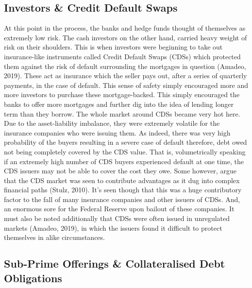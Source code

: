 \documentclass[11pt, english]{article}
\begin{document}
	\subsection{Investors \& Credit Default Swaps}

	At this point in the process, the banks and hedge funds thought of themselves as extremely low risk. The cash investors on the other hand, carried heavy weight of risk on their shoulders. This is when investors were beginning to take out insurance-like instruments called Credit Default Swaps (CDSs) which protected them against the risk of default surrounding the mortgages in question (Amadeo, 2019). These act as insurance which the seller pays out, after a series of quarterly payments, in the case of default. This sense of safety simply encouraged more and more investors to purchase these mortgage-backed. This simply encouraged the banks to offer more mortgages and further dig into the idea of lending longer term than they borrow. The whole market around CDSs became very hot here. Due to the asset-liability imbalance, they were extremely volatile for the insurance companies who were issuing them. As indeed, there was very high probability of the buyers resulting in a severe case of default therefore, debt owed not being completely covered by the CDS value. That is, volumetrically speaking if an extremely high number of CDS buyers experienced default at one time, the CDS issuers may not be able to cover the cost they owe. Some however, argue that the CDS market was seen to contribute advantages as it dug into complex financial paths (Stulz, 2010). It’s seen though that this was a huge contributory factor to the fall of many insurance companies and other issuers of CDSs. And, an enormous sore for the Federal Reserve upon bailout of these companies. It must also be noted additionally that CDSs were often issued in unregulated markets (Amadeo, 2019), in which the issuers found it difficult to protect themselves in alike circumstances.

	\subsection{Sub-Prime Offerings \& Collateralised Debt Obligations}
\end{document}
